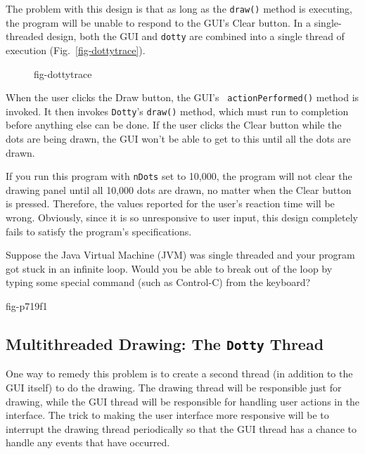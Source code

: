 The problem with this design is that as long as the {\tt draw()}
method is executing, the program will be unable to respond to
the GUI's Clear button.  In a single-threaded design, both the
GUI and {\tt dotty} are combined into a single thread of execution
(Fig.~\ref{fig-dottytrace}).
\begin{figure}[h!]
 {fig-dottytrace}

\end{figure}
When the user clicks the Draw button, the GUI's {\tt
actionPerformed()} method is invoked.  It then invokes {\tt Dotty}'s
{\tt draw()} method, which must run to completion before anything else
can be done.  If the user clicks the Clear button while the dots are
being drawn, the GUI won't be able to get to this until all the dots
are drawn.

If you run this program with {\tt nDots} set to 10,000, the program
will not clear the drawing panel until all 10,000 dots are drawn, no
matter when the Clear button is pressed.  Therefore, the values
reported for the user's reaction time will be wrong.   Obviously, since
it is so unresponsive to user input, this design completely fails to
satisfy the program's specifications.


\begin{SSTUDY}

\item  Suppose the Java Virtual Machine (JVM) was single threaded and your
program got stuck in an infinite loop.  Would you be able to break out
of the loop by typing some special command (such as Control-C) from
the keyboard?
\end{SSTUDY}

{fig-p719f1}

\subsection{Multithreaded Drawing: The {\tt Dotty} Thread}
\noindent One way to remedy this problem is to create a second thread (in
addition to the GUI itself) to do the drawing.  The drawing thread
will be responsible just for drawing, while the GUI thread will be
responsible for handling user actions in the interface.   The trick to
making the user interface more responsive will be to interrupt the
drawing thread periodically so that the GUI thread has a chance to
handle any events that have occurred.

